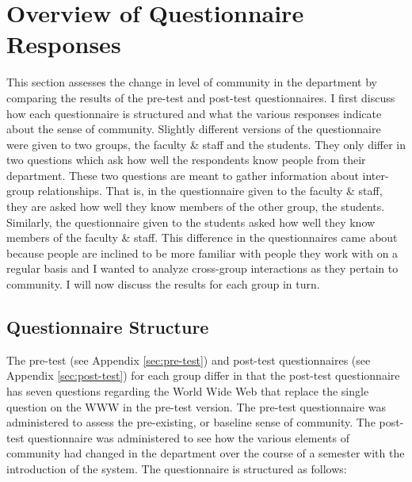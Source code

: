 \section{Overview of Questionnaire Responses}
This section assesses the change in level of community in the department by
comparing the results of the pre-test and post-test questionnaires.  I first
discuss how each questionnaire is structured and what the various responses
indicate about the sense of community.  Slightly different versions of the
questionnaire were given to two groups, the faculty \& staff and the students.
They only differ in two questions which ask how well the respondents know
people from their department.  These two questions are meant to gather
information about inter-group relationships.  That is, in the questionnaire
given to the faculty \& staff, they are asked how well they know members of the
other group, the students.  Similarly, the questionnaire given to the students
asked how well they know members of the faculty \& staff.  This difference in
the questionnaires came about because people are inclined to be more familiar
with people they work with on a regular basis and I wanted to analyze
cross-group interactions as they pertain to community.  I will now discuss the
results for each group in turn.

\subsection{Questionnaire Structure}
The pre-test (see Appendix \ref{sec:pre-test}) and post-test questionnaires
(see Appendix \ref{sec:post-test}) for each group differ in that the post-test
questionnaire has seven questions regarding the World Wide Web that replace the
single question on the WWW in the pre-test version.  The pre-test questionnaire
was administered to assess the pre-existing, or baseline sense of community.
The post-test questionnaire was administered to see how the various elements of
community had changed in the department over the course of a semester with the
introduction of the system.  The questionnaire is structured as follows:

